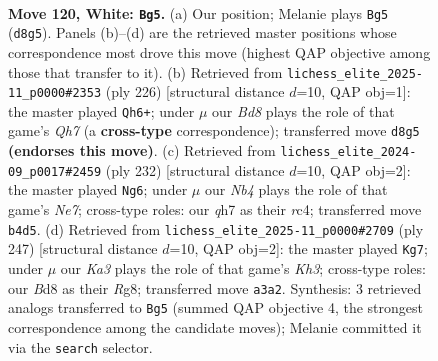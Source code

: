 \documentclass[11pt]{article}
\begin{document}
\clearpage

\begin{figure}[p]\centering
\begin{subfigure}{0.46\textwidth}\centering
\resizebox{\linewidth}{!}{%
\newchessgame
\chessboard[
  setfen={3B4/1k5q/8/8/1N6/K7/8/8 w - - 8 120},
  showmover=false,
  pgfstyle=straightmove, color=movearrow, markmove={d8-g5}
]}
\caption{}
\end{subfigure}\hfill
\begin{subfigure}{0.46\textwidth}\centering
\resizebox{\linewidth}{!}{%
\newchessgame
\chessboard[
  setfen={1K6/7Q/8/8/8/8/8/q1k5 w - - 58 114},
  showmover=false,
  pgfstyle=straightmove, color=movearrow, markmove={h7-h6}
]}
\caption{}
\end{subfigure}
\\[4pt]
\begin{subfigure}{0.46\textwidth}\centering
\resizebox{\linewidth}{!}{%
\newchessgame
\chessboard[
  setfen={4K3/4N3/8/8/2r1k3/8/8/8 w - - 82 117},
  showmover=false,
  pgfstyle=straightmove, color=movearrow, markmove={e7-g6}
]}
\caption{}
\end{subfigure}\hfill
\begin{subfigure}{0.46\textwidth}\centering
\resizebox{\linewidth}{!}{%
\newchessgame
\chessboard[
  setfen={6r1/4K3/7k/8/4Q3/8/8/8 b - - 56 124},
  showmover=false,
  pgfstyle=straightmove, color=movearrow, markmove={h6-g7}
]}
\caption{}
\end{subfigure}
\caption{\textbf{Move 120, White: \texttt{Bg5}.} (a) Our position; Melanie plays \texttt{Bg5} (\texttt{d8g5}). Panels (b)--(d) are the retrieved master positions whose correspondence most drove this move (highest QAP objective among those that transfer to it). (b) Retrieved from \texttt{lichess\_elite\_2025-11\_p0000\#2353} (ply 226) [structural distance $d$=10, QAP obj=1]: the master played \texttt{Qh6+}; under $\mu$ our \emph{Bd8} plays the role of that game's \emph{Qh7} (a \textbf{cross-type} correspondence); transferred move \texttt{d8g5} \textbf{(endorses this move)}. (c) Retrieved from \texttt{lichess\_elite\_2024-09\_p0017\#2459} (ply 232) [structural distance $d$=10, QAP obj=2]: the master played \texttt{Ng6}; under $\mu$ our \emph{Nb4} plays the role of that game's \emph{Ne7}; cross-type roles: our \emph{q}h7 as their \emph{r}c4; transferred move \texttt{b4d5}. (d) Retrieved from \texttt{lichess\_elite\_2025-11\_p0000\#2709} (ply 247) [structural distance $d$=10, QAP obj=2]: the master played \texttt{Kg7}; under $\mu$ our \emph{Ka3} plays the role of that game's \emph{Kh3}; cross-type roles: our \emph{B}d8 as their \emph{R}g8; transferred move \texttt{a3a2}. Synthesis: 3 retrieved analogs transferred to \texttt{Bg5} (summed QAP objective 4, the strongest correspondence among the candidate moves); Melanie committed it via the \texttt{search} selector.}
\label{fig:thought-m238}
\end{figure}
\end{document}
